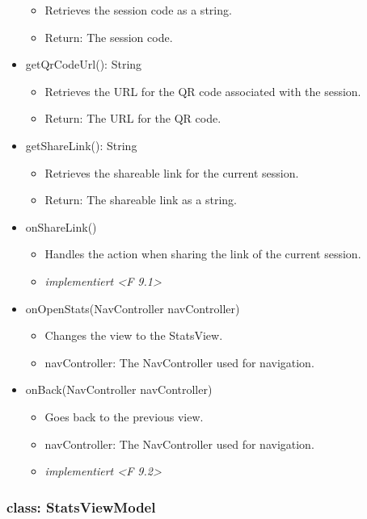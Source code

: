 \documentclass[oneside, ngerman]{sdqtechreport}
\begin{document}
\begin{itemize}
\begin{itemize}
            \item Retrieves the session code as a string.
            \item Return: The session code.
        \end{itemize}
    \item getQrCodeUrl(): String
        \begin{itemize}
            \item Retrieves the URL for the QR code associated with the session.
            \item Return: The URL for the QR code.
        \end{itemize}
    \item getShareLink(): String
        \begin{itemize}
            \item Retrieves the shareable link for the current session.
            \item Return: The shareable link as a string.
        \end{itemize}
    \item onShareLink()
        \begin{itemize}
            \item Handles the action when sharing the link of the current session.
            \item \textit{implementiert <F 9.1>}
        \end{itemize}
    \item onOpenStats(NavController navController)
        \begin{itemize}
            \item Changes the view to the StatsView.
            \item navController: The NavController used for navigation.
        \end{itemize}
    \item onBack(NavController navController)
        \begin{itemize}
            \item Goes back to the previous view.
            \item navController: The NavController used for navigation.
            \item \textit{implementiert <F 9.2>}
        \end{itemize}
\end{itemize}



\subsubsection{class: StatsViewModel}
\end{document}
